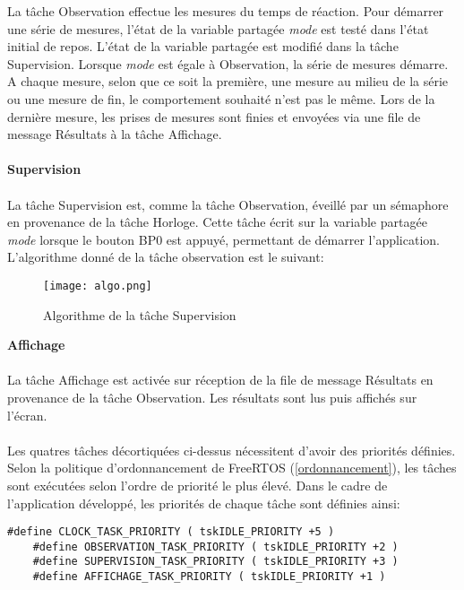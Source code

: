 \indent La tâche Observation effectue les mesures du temps de réaction.
Pour démarrer une série de mesures, l'état de la variable partagée \textit{mode} est testé dans l'état initial de repos.
L'état de la variable partagée est modifié dans la tâche Supervision.
Lorsque \textit{mode} est égale à Observation, la série de mesures démarre.
A chaque mesure, selon que ce soit la première, une mesure au milieu de la série ou une mesure de fin, le comportement souhaité n'est pas le même.
Lors de la dernière mesure, les prises de mesures sont finies et envoyées via une file de message Résultats à la tâche Affichage.
\\\\
\textbf{Supervision}
\\\\
La tâche Supervision est, comme la tâche Observation, éveillé par un sémaphore en provenance de la tâche Horloge.
Cette tâche écrit sur la variable partagée \textit{mode} lorsque le bouton BP0 est appuyé, permettant de démarrer l'application.
L'algorithme donné de la tâche observation est le suivant:

\begin{figure}[h]
    \centering
    \texttt{[image: algo.png]}
    \caption{Algorithme de la tâche Supervision}
    \label{fig:algo}
\end{figure}

\textbf{Affichage}
\\\\
La tâche Affichage est activée sur réception de la file de message Résultats en provenance de la tâche Observation.
Les résultats sont lus puis affichés sur l'écran.
\\\\

\indent Les quatres tâches décortiquées ci-dessus nécessitent d'avoir des priorités définies.
Selon la politique d'ordonnancement de FreeRTOS (\ref{ordonnancement}), les tâches sont exécutées selon l'ordre de priorité le plus élevé.
Dans le cadre de l'application développé, les priorités de chaque tâche sont définies ainsi:

\begin{lstlisting}[style=CStyle]
    #define CLOCK_TASK_PRIORITY ( tskIDLE_PRIORITY +5 ) 
    #define OBSERVATION_TASK_PRIORITY ( tskIDLE_PRIORITY +2 )
    #define SUPERVISION_TASK_PRIORITY ( tskIDLE_PRIORITY +3 )
    #define AFFICHAGE_TASK_PRIORITY ( tskIDLE_PRIORITY +1 )
\end{lstlisting}

